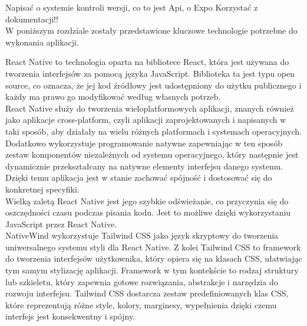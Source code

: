 Napisać o systemie kontroli wersji, co to jest Api, o Expo
Korzystać z dokumentacji!!\\

W poniższym rozdziale zostały przedstawione kluczowe technologie potrzebne do wykonania aplikacji.\\
\phantom{Th} 



\cite{reactnative} React Native to technologia oparta na bibliotece React, która jest używana do tworzenia interfejsów za pomocą języka JavaScript.  Biblioteka ta jest typu open source, co oznacza, że jej kod źródłowy jest udostępniony do użytku publicznego i każdy ma prawo go modyfikować według własnych potrzeb. \\
 
React Native służy do tworzenia wieloplatformowych aplikacji, znanych również jako aplikacje cross-platform, czyli aplikacji zaprojektowanych i napisanych w taki sposób, aby działały na wielu różnych platformach i systemach operacyjnych. Dodatkowo wykorzystuje programowanie natywne zapewniając w ten sposób zestaw komponentów niezależnych od systemu operacyjnego, który następnie jest dynamicznie przekształcany na natywne elementy interfejsu danego systemu. Dzięki temu aplikacja jest w stanie zachować spójność i dostosować się do  konkretnej specyfiki.\\

Wielką zaletą React Native jest jego szybkie odświeżanie, co przyczynia się do oszczędności czasu podczas pisania kodu. Jest to możliwe dzięki wykorzystaniu JavaScript przez React Native.\\



\cite{nativewind} NativeWind wykorzystuje Tailwind CSS jako język skryptowy do tworzenia uniwersalnego systemu styli dla React Native. Z kolei Tailwind CSS to framework do tworzenia interfejsów użytkownika, który opiera się na klasach CSS, ułatwiając tym samym stylizację aplikacji. Framework w tym kontekście to rodzaj struktury lub szkieletu, który zapewnia gotowe rozwiązania, abstrakcje i narzędzia do rozwoju interfejsu. Tailwind CSS dostarcza zestaw predefiniowanych klas CSS, które reprezentują różne style, kolory, marginesy, wypełnienia dzięki czemu interfejs jest konsekwentny i spójny.  \\

